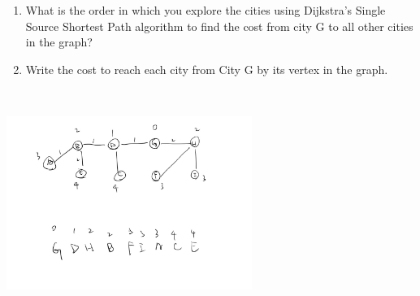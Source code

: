 \documentclass[12pt]{article}
\newenvironment{sol}[1][Solution]{\begin{trivlist}\item[\hskip\labelsep {\bfseries #1:}]}{\end{trivlist}}
\begin{document}
\begin{enumerate}
        \begin{enumerate}
            \item What is the order in which you explore the cities using Dijkstra’s Single Source Shortest Path algorithm to find the cost from city G to all other cities in the graph?
            \item Write the cost to reach each city from City G by its vertex in the graph.
        \end{enumerate}
        \begin{sol}
                \hspace*{\fill}\\
                \begin{center}
            \includegraphics[width = 0.6\textwidth]{p9.jpg}
        \end{center}
        \end{sol}
        

\end{enumerate}
\end{document}
